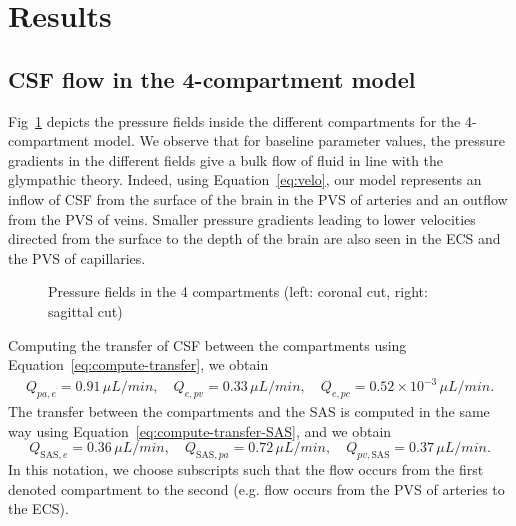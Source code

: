\documentclass[10pt]{article}
\newcommand{\VV}[1]{\textcolor{red}{VV: #1}}
\newcommand{\ie}{\emph{i.e.}\;}
\newcommand{\1}{^{(1)}}
\newcommand{\2}{^{(2)}}
\newcommand{\commentout}[1]{}
\begin{document}
\section{Results}
\label{sec:results}

\label{sec:application}

\subsection{CSF flow in the 4-compartment model}
Fig~\ref{fig:pressure-Inulin-compartments} depicts the pressure fields inside the different compartments for the 4-compartment model. We observe that for baseline parameter values, the pressure gradients in the different fields give a bulk flow of fluid in line with the glympathic theory. Indeed, using Equation~\eqref{eq:velo}, our model represents an inflow of CSF from the surface of the brain in the PVS of arteries and an outflow from the PVS of veins. Smaller pressure gradients leading to lower velocities directed from the surface to the depth of the brain are also seen in the ECS and the PVS of capillaries. 
\begin{figure}[htbp]
    \centering
    \caption{Pressure fields in the 4 compartments (left: coronal cut, right: sagittal cut)}
    \label{fig:pressure-Inulin-compartments}
\end{figure}

Computing the transfer of CSF between the compartments using Equation~\eqref{eq:compute-transfer}, we obtain 
\[
\begin{aligned}
    Q_{pa,e} =  0.91 \, \si{\mu L/min},\quad Q_{e,pv} = 0.33 \, \si{\mu L/min},\quad Q_{e,pc} = 0.52\times 10^{-3} \, \si{\mu L/min}.
\end{aligned}
\]
The transfer between the compartments and the SAS is computed in the same way using Equation~\eqref{eq:compute-transfer-SAS}, and we obtain
\[
Q_{\text{SAS},e} = 0.36 \, \si{\mu L/min} , \quad Q_{\text{SAS},pa} = 0.72 \, \si{\mu L/min},\quad Q_{pv,\text{SAS}} = 0.37 \, \si{\mu L/min}.
\]
In this notation, we choose subscripts such that the flow occurs from the first denoted compartment to the second (e.g. flow occurs from the PVS of arteries to the ECS). 
\commentout{
\VV{Searching through literature, it seems they report mouse CSF production in nl/min. I found 100 nL/min in~\cite{liu2020direct}.}In other words, it means that every hour, the periarterial space transfers $0.03 \si{mL}$ of CSF to the extracellular space (\ie roughly $13.3\%$ of CSF circulates in the ECS in 1 hour\VV{reference for this?}). 
}
\end{document}
